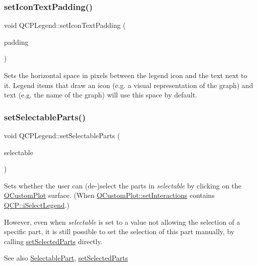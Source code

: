\subsubsection{\texorpdfstring{set\+Icon\+Text\+Padding()}{setIconTextPadding()}}
{\footnotesize\ttfamily void Q\+C\+P\+Legend\+::set\+Icon\+Text\+Padding (\begin{DoxyParamCaption}\item[{int}]{padding }\end{DoxyParamCaption})}

Sets the horizontal space in pixels between the legend icon and the text next to it. Legend items that draw an icon (e.\+g. a visual representation of the graph) and text (e.\+g. the name of the graph) will use this space by default. \hypertarget{class_q_c_p_legend_a9ce60aa8bbd89f62ae4fa83ac6c60110}{}\label{class_q_c_p_legend_a9ce60aa8bbd89f62ae4fa83ac6c60110} 
\subsubsection{\texorpdfstring{set\+Selectable\+Parts()}{setSelectableParts()}}
{\footnotesize\ttfamily void Q\+C\+P\+Legend\+::set\+Selectable\+Parts (\begin{DoxyParamCaption}\item[{const Selectable\+Parts \&}]{selectable }\end{DoxyParamCaption})}

Sets whether the user can (de-\/)select the parts in {\itshape selectable} by clicking on the \hyperlink{class_q_custom_plot}{Q\+Custom\+Plot} surface. (When \hyperlink{class_q_custom_plot_a5ee1e2f6ae27419deca53e75907c27e5}{Q\+Custom\+Plot\+::set\+Interactions} contains \hyperlink{namespace_q_c_p_a2ad6bb6281c7c2d593d4277b44c2b037a269c9af298e257d1108edec0432b5513}{Q\+C\+P\+::i\+Select\+Legend}.)

However, even when {\itshape selectable} is set to a value not allowing the selection of a specific part, it is still possible to set the selection of this part manually, by calling \hyperlink{class_q_c_p_legend_a2aee309bb5c2a794b1987f3fc97f8ad8}{set\+Selected\+Parts} directly.

\begin{DoxySeeAlso}{See also}
\hyperlink{class_q_c_p_legend_a5404de8bc1e4a994ca4ae69e2c7072f1}{Selectable\+Part}, \hyperlink{class_q_c_p_legend_a2aee309bb5c2a794b1987f3fc97f8ad8}{set\+Selected\+Parts} 
\end{DoxySeeAlso}
\hypertarget{class_q_c_p_legend_a2c35d262953a25d96b6112653fbefc88}{}\label{class_q_c_p_legend_a2c35d262953a25d96b6112653fbefc88} 
